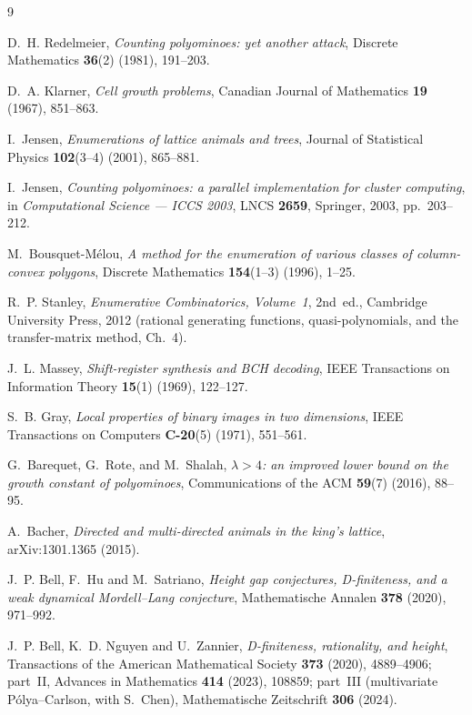 \documentclass[11pt]{article}
\begin{document}
\begin{thebibliography}{9}

D.~H. Redelmeier,
\emph{Counting polyominoes: yet another attack},
Discrete Mathematics \textbf{36}(2) (1981), 191--203.

D.~A. Klarner,
\emph{Cell growth problems},
Canadian Journal of Mathematics \textbf{19} (1967), 851--863.

I.~Jensen,
\emph{Enumerations of lattice animals and trees},
Journal of Statistical Physics \textbf{102}(3--4) (2001), 865--881.

I.~Jensen,
\emph{Counting polyominoes: a parallel implementation for cluster computing},
in \emph{Computational Science --- ICCS 2003}, LNCS \textbf{2659}, Springer,
2003, pp.~203--212.

M.~Bousquet-M\'elou,
\emph{A method for the enumeration of various classes of column-convex polygons},
Discrete Mathematics \textbf{154}(1--3) (1996), 1--25.

R.~P. Stanley,
\emph{Enumerative Combinatorics, Volume~1}, 2nd~ed.,
Cambridge University Press, 2012 (rational generating functions,
quasi-polynomials, and the transfer-matrix method, Ch.~4).

J.~L. Massey,
\emph{Shift-register synthesis and BCH decoding},
IEEE Transactions on Information Theory \textbf{15}(1) (1969), 122--127.

S.~B. Gray,
\emph{Local properties of binary images in two dimensions},
IEEE Transactions on Computers \textbf{C-20}(5) (1971), 551--561.

G.~Barequet, G.~Rote, and M.~Shalah,
\emph{$\lambda > 4$: an improved lower bound on the growth constant of polyominoes},
Communications of the ACM \textbf{59}(7) (2016), 88--95.

A.~Bacher,
\emph{Directed and multi-directed animals in the king's lattice},
arXiv:1301.1365 (2015).

J.~P. Bell, F.~Hu and M.~Satriano,
\emph{Height gap conjectures, D-finiteness, and a weak dynamical
Mordell--Lang conjecture},
Mathematische Annalen \textbf{378} (2020), 971--992.

J.~P. Bell, K.~D. Nguyen and U.~Zannier,
\emph{D-finiteness, rationality, and height},
Transactions of the American Mathematical Society \textbf{373} (2020),
4889--4906; part~II, Advances in Mathematics \textbf{414} (2023), 108859;
part~III (multivariate P\'olya--Carlson, with S.~Chen), Mathematische
Zeitschrift \textbf{306} (2024).


\end{thebibliography}
\end{document}
